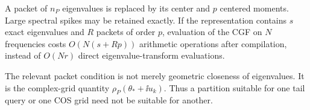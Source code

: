 \begin{remark}\label{claim:final-26-3}
A packet of $n_P$ eigenvalues is replaced by its center and $p$ centered moments. Large spectral spikes may be retained exactly. If the representation contains $s$ exact eigenvalues and $R$ packets of order $p$, evaluation of the CGF on $N$ frequencies costs $O(N(s+Rp))$ arithmetic operations after compilation, instead of $O(Nr)$ direct eigenvalue-transform evaluations.
\end{remark}

\begin{remark}\label{claim:final-26-4}
The relevant packet condition is not merely geometric closeness of eigenvalues. It is the complex-grid quantity $\rho_P(\theta_*+\ii u_k)$. Thus a partition suitable for one tail query or one COS grid need not be suitable for another.
\end{remark}


